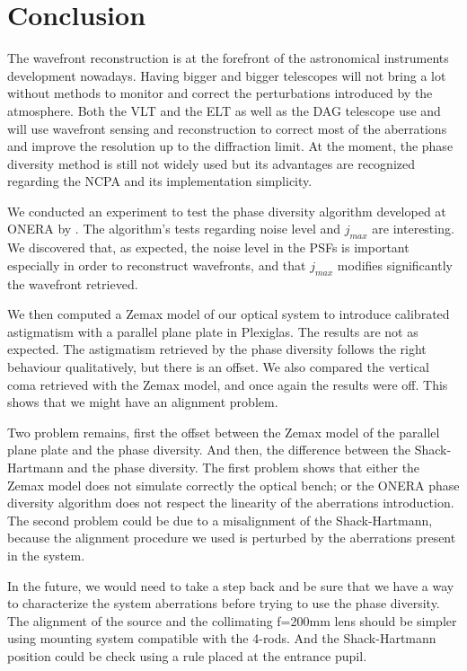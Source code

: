 
\chapter*{Conclusion}
\label{Conclusion}

The wavefront reconstruction is at the forefront of the astronomical instruments development nowadays. Having bigger and bigger telescopes will not bring a lot without methods to monitor and correct the perturbations introduced by the atmosphere. Both the VLT and the ELT as well as the DAG telescope use and will use wavefront sensing and reconstruction to correct most of the aberrations and improve the resolution up to the diffraction limit. At the moment, the phase diversity method is still not widely used but its advantages are recognized regarding the NCPA and its implementation simplicity.

\vspace{1cm}

We conducted an experiment to test the phase diversity algorithm developed at ONERA by \citet{mugnier_2006}. The algorithm's tests regarding noise level and $j_{max}$ are interesting. We discovered that, as expected, the noise level in the PSFs is important especially in order to reconstruct wavefronts, and that $j_{max}$ modifies significantly the wavefront retrieved.

We then computed a Zemax model of our optical system to introduce calibrated astigmatism with a parallel plane plate in Plexiglas. The results are not as expected. The astigmatism retrieved by the phase diversity follows the right behaviour qualitatively, but there is an offset. We also compared the vertical coma retrieved with the Zemax model, and once again the results were off. This shows that we might have an alignment problem.

Two problem remains, first the offset between the Zemax model of the parallel plane plate and the phase diversity. And then, the difference between the Shack-Hartmann and the phase diversity. The first problem shows that either the Zemax model does not simulate correctly the optical bench; or the ONERA phase diversity algorithm does not respect the linearity of the aberrations introduction. The second problem could be due to a misalignment of the Shack-Hartmann, because the alignment procedure we used is perturbed by the aberrations present in the system.

In the future, we would need to take a step back and be sure that we have a way to characterize the system aberrations before trying to use the phase diversity. The alignment of the source and the collimating f=200mm lens should be simpler using mounting system compatible with the 4-rods. And the Shack-Hartmann position could be check using a rule placed at the entrance pupil.

